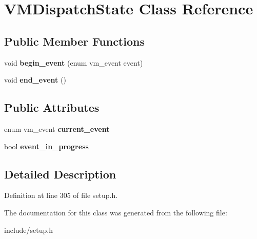 \hypertarget{classVMDispatchState}{\section{V\-M\-Dispatch\-State Class Reference}
\label{classVMDispatchState}
}
\subsection*{Public Member Functions}
\begin{DoxyCompactItemize}
\item 
\hypertarget{classVMDispatchState_a3a0362f365280487cf9d34390ed0b2dc}{void {\bfseries begin\-\_\-event} (enum vm\-\_\-event event)}\label{classVMDispatchState_a3a0362f365280487cf9d34390ed0b2dc}

\item 
\hypertarget{classVMDispatchState_ac8a6709d68dbc4bf1a460292d52beab0}{void {\bfseries end\-\_\-event} ()}\label{classVMDispatchState_ac8a6709d68dbc4bf1a460292d52beab0}

\end{DoxyCompactItemize}
\subsection*{Public Attributes}
\begin{DoxyCompactItemize}
\item 
\hypertarget{classVMDispatchState_a0a92ac377b1d3e68d8dd3af2c8c433ba}{enum vm\-\_\-event {\bfseries current\-\_\-event}}\label{classVMDispatchState_a0a92ac377b1d3e68d8dd3af2c8c433ba}

\item 
\hypertarget{classVMDispatchState_a46c3a4522f352e7da32a6553fd27a471}{bool {\bfseries event\-\_\-in\-\_\-progress}}\label{classVMDispatchState_a46c3a4522f352e7da32a6553fd27a471}

\end{DoxyCompactItemize}


\subsection{Detailed Description}


Definition at line 305 of file setup.\-h.



The documentation for this class was generated from the following file\-:\begin{DoxyCompactItemize}
\item 
include/setup.\-h\end{DoxyCompactItemize}

